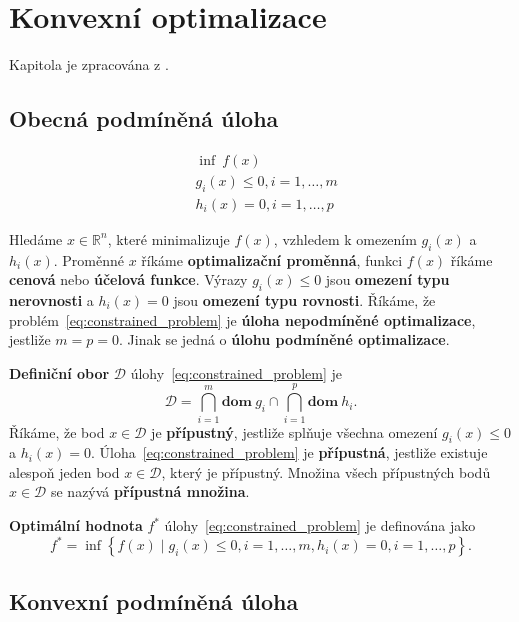 \chapter{Konvexní optimalizace}

Kapitola je zpracována z \cite{convex-optimization}.

\section{Obecná podmíněná úloha}

\begin{equation}\label{eq:constrained_problem}
    \begin{split}
        &\inf\ f(x) \\
        &g_i(x) \leq 0, i = 1, \dots, m \\
        &h_i(x) = 0, i = 1, \dots, p
    \end{split}
\end{equation}

Hledáme $x \in \mathbb{R}^n$, které minimalizuje $f(x)$, vzhledem k omezením $g_i(x)$ a $h_i(x)$. Proměnné $x$ říkáme \textbf{optimalizační proměnná}, funkci $f(x)$ říkáme \textbf{cenová} nebo \textbf{účelová funkce}. Výrazy $g_i(x) \leq 0$ jsou \textbf{omezení typu nerovnosti} a $h_i(x) = 0$ jsou \textbf{omezení typu rovnosti}. Říkáme, že problém~\ref{eq:constrained_problem} je \textbf{úloha nepodmíněné optimalizace}, jestliže $m = p = 0$. Jinak se jedná o \textbf{úlohu podmíněné optimalizace}.

\textbf{Definiční obor} $\mathcal{D}$ úlohy~\ref{eq:constrained_problem} je
$$
    \mathcal{D} = \bigcap_{i=1}^m \textbf{dom}\ g_i \cap \bigcap_{i=1}^p \textbf{dom}\ h_i.
$$
Říkáme, že bod $x \in \mathcal{D}$ je \textbf{přípustný}, jestliže splňuje všechna omezení $g_i(x) \leq 0$ a $h_i(x) = 0$. Úloha~\ref{eq:constrained_problem} je \textbf{přípustná}, jestliže existuje alespoň jeden bod $x \in \mathcal{D}$, který je přípustný. Množina všech přípustných bodů $x \in \mathcal{D}$ se nazývá \textbf{přípustná množina}.

\textbf{Optimální hodnota} $f^*$ úlohy~\ref{eq:constrained_problem} je definována jako
$$
    f^* = \inf \left\{ f(x) \mid g_i(x) \leq 0, i = 1, \dots, m, h_i(x) = 0, i = 1, \dots, p \right\}.
$$

\section{Konvexní podmíněná úloha}

